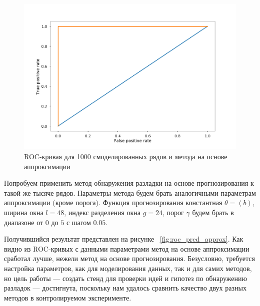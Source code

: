 \documentclass[%
12pt,
master,  %
natbib,      %
subf,        %
substylefile = spbu.rtx,
href,        %
colorlinks,  %
]{disser}
\begin{document}


\begin{figure}[!hhh]
	\begin{center}
		\includegraphics[width=12cm]{approximation_mean_2_roc}
	\end{center}
	\vspace{-5mm}\caption{ROC-кривая для 1000 смоделированных рядов и метода на основе аппроксимации}
	\label{fig:approximation_mean_2_roc}
\end{figure}

Попробуем применить метод обнаружения разладки на основе прогнозирования к такой же тысяче рядов. Параметры метода будем брать аналогичными параметрам аппроксимации (кроме порога). 
Функция прогнозирования константная $\theta = (b)$, ширина окна $l = 48$, индекс разделения окна $g = 24$, порог $\gamma$ будем брать в диапазоне от $0$ до $5$ с шагом $0.05$.

Получившийся результат представлен на рисунке ~\ref{fig:roc_pred_approx}. Как видно из ROC-кривых с данными параметрами метод на основе аппроксимации сработал лучше, нежели метод на основе прогнозирования. Безусловно, требуется настройка параметров, как для моделирования данных, так и для самих методов, но цель работы --- создать стенд для проверки идей и гипотез по обнаружению разладок --- достигнута, поскольку нам удалось сравнить качество двух разных методов в контролируемом эксперименте.
\end{document}
